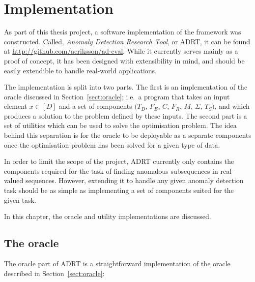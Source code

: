 \chapter{Implementation}
\label{ch:implementation}

As part of this thesis project, a software implementation of the framework was constructed. Called, \emph{Anomaly Detection Research Tool}, or ADRT, it can be found at \url{http://github.com/aeriksson/ad-eval}. While it currently serves mainly as a proof of concept, it has been designed with extensibility in mind, and should be easily extendible to handle real-world applications.

The implementation is split into two parts. The first is an implementation of the oracle discussed in Section~\ref{sect:oracle}; i.e.\ a program that takes an input element $x \in [D]$ and a set of components $(T_D$, $F_E$, $C$, $F_R$, $M$, $\Sigma$, $T_S)$, and which produces a solution to the problem defined by these inputs. The second part is a set of utilities which can be used to solve the optimisation problem. The idea behind this separation is for the oracle to be deployable as a separate components once the optimisation problem has been solved for a given type of data.

In order to limit the scope of the project, ADRT currently only contains the components required for the task of finding anomalous subsequences in real-valued sequences. However, extending it to handle any given anomaly detection task should be as simple as implementing a set of components suited for the given task.

In this chapter, the oracle and utility implementations are discussed.

\section{The oracle}

The oracle part of ADRT is a straightforward implementation of the oracle described in Section~\ref{sect:oracle}:

\begin{algorithmic}
     
    \EndFor{}
\end{algorithmic}

